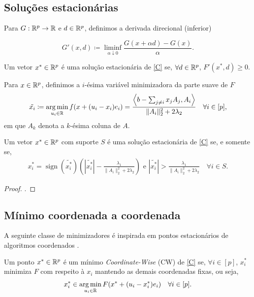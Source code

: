 \subsection{Soluções estacionárias}
Para $G:\mathbb{R}^p\to \mathbb{R}$ e $d\in\mathbb{R}^p$, definimos a derivada direcional (inferior) 

\[G'(x, d)\coloneq \liminf_{\alpha\downarrow0}\frac{G(x+\alpha d)-G(x)}{\alpha}.\]

\begin{definition}
    Um vetor $x^*\in\mathbb{R}^p$ é uma solução estacionária de \eqref{C} se, $\forall d\in\mathbb{R}^p$, $F'(x^*,d)\geq 0$. 
\end{definition}

Para $x\in\mathbb{R}^p$, definimos a $i$-ésima variável minimizadora da parte suave de $F$
\begin{equation}
\tilde{x_i}\coloneqq\operatorname*{arg\,min}_{u_i\in\mathbb{R}}f(x+(u_i-x_i)e_i)=\frac{\left\langle b-\sum_{j\neq i}x_jA_j,A_i \right\rangle}{\|A_i\|^2_2+2\lambda_2}\quad\forall i\in [p],\label{tilde}
\end{equation}
em que $A_k$ denota a $k$-ésima coluna de $A$. 

\begin{lemma}\label{statlemma}
    Um vetor $x^*\in\mathbb{R}^p$ com suporte $S$ é uma solução estacionária de \eqref{C} se, e somente se, 
    \begin{equation}
    \begin{aligned}
    x^*_i=\operatorname{sign}(\tilde{x^*_i})\left(|\tilde{x^*_i}|-\frac{\lambda_1}{\|A_i\|^2_2+2\lambda_2}\right)\text{ e } |\tilde{x^*_i}|>\frac{\lambda_1}{\|A_i\|^2_2+2\lambda_2}
    \quad \forall i\in S.\end{aligned}\label{statprox}
    \end{equation}
\end{lemma}
\begin{proof}
    \cite[Lemma 1]{fastselect}.
\end{proof}

\subsection{Mínimo coordenada a coordenada}
A seguinte classe de minimizadores é inspirada em pontos estacionários de algoritmos coordenados \cite{fastselect}.

\begin{definition}[Mínimo CW]
    Um ponto $x^*\in\mathbb{R}^p$ é um mínimo \textit{Coordinate-Wise} (CW) de \eqref{C} se, $\forall i\in [p]$, $x_i^*$ minimiza $F$ com respeito à $x_i$ mantendo as demais coordenadas fixas, ou seja, 
    \[x_i^*\in \operatorname*{arg\,min}_{u_i\in\mathbb{R}}F(x^*+(u_i-x_i^*)e_i)\quad \forall i\in [p].\]
\end{definition}

